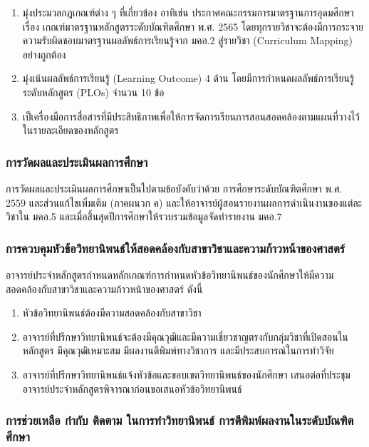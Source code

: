 \begin{enumerate}
   	\item มุ่งประมวลกฎเกณฑ์ต่าง ๆ ที่เกี่ยวข้อง อาทิเช่น ประกาศคณะกรรมการมาตรฐานการอุดมศึกษา เรื่อง เกณฑ์มาตรฐานหลักสูตรระดับบัณฑิตศึกษา พ.ศ. 2565 โดยทุกรายวิชาจะต้องมีการกระจายความรับผิดชอบมาตรฐานผลลัพธ์การเรียนรู้จาก มคอ.2 สู่รายวิชา (Curriculum Mapping) อย่างถูกต้อง
  
   	  	\item มุ่งเน้นผลลัพธ์การเรียนรู้ (Learning Outcome) 4 ด้าน โดยมีการกำหนดผลลัพธ์การเรียนรู้ระดับหลักสูตร (PLOs) จำนวน 10 ข้อ
   	    	
   	\item  เป็เครื่องมือการสื่อสารที่มีประสิทธิภาพเพื่อให้การจัดการเรียนการสอนสอดคล้องตามแผนที่วางไว้ในรายละเอียดของหลักสูตร
   	\end{enumerate} 

\subsubsection{การวัดผลและประเมินผลการศึกษา}
การวัดผลและประเมินผลการศึกษาเป็นไปตามข้อบังคับ\university ว่าด้วย
การศึกษาระดับบัณฑิตศึกษา พ.ศ. 2559 และส่วนแก้ไขเพิ่มเติม (ภาคผนวก ค) และให้อาจารย์ผู้สอนรายงานผลการดำเนินงานของแต่ละวิชาใน มคอ.5 และเมื่อสิ้นสุดปีการศึกษาให้รวบรวมข้อมูลจัดทำรายงาน มคอ.7

\subsubsection{การควบคุมหัวข้อวิทยานิพนธ์ให้สอดคล้องกับสาขาวิชาและความก้าวหน้าของศาสตร์}

อาจารย์ประจำหลักสูตรกำหนดหลักเกณฑ์การกำหนดหัวข้อวิทยานิพนธ์ของนักศึกษาให้มีความสอดคล้องกับสาขาวิชาและความก้าวหน้าของศาสตร์ ดังนี้
  \begin{enumerate}
   	\item หัวข้อวิทยานิพนธ์ต้องมีความสอดคล้องกับสาขาวิชา\thdegreebranch
   	\item อาจารย์ที่ปรึกษาวิทยานิพนธ์จะต้องมีคุณวุฒิและมีความเชี่ยวชาญตรงกับกลุ่มวิชาที่เปิดสอนในหลักสูตร มีคุณวุฒิเหมาะสม มีผลงานตีพิมพ์ทางวิชาการ และมีประสบการณ์ในการทำวิจัย   	
   	\item  อาจารย์ที่ปรึกษาวิทยานิพนธ์แจ้งหัวข้อและขอบเขตวิทยานิพนธ์ของนักศึกษา เสนอต่อที่ประชุมอาจารย์ประจำหลักสูตรพิจารณาก่อนขอเสนอหัวข้อวิทยานิพนธ์  	
   	\end{enumerate}  

\subsubsection{การช่วยเหลือ กำกับ ติดตาม ในการทำวิทยานิพนธ์ การตีพิมพ์ผลงานในระดับบัณฑิตศึกษา}

